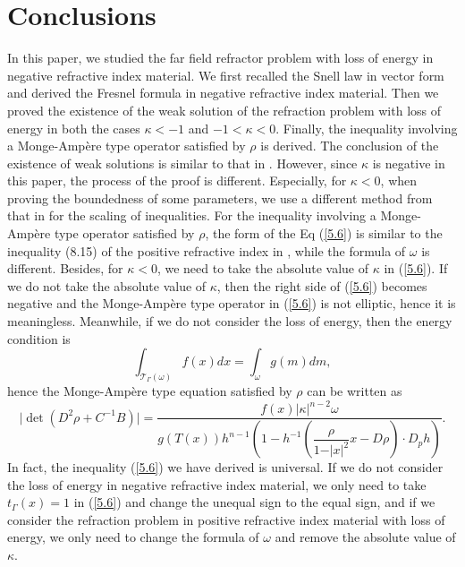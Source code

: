 \documentclass[a4paper,12pt,]{article}
\numberwithin{equation}{section}
\numberwithin{equation}{section} \allowdisplaybreaks
\begin{document}
\section{Conclusions}\label{Section 6}

\sloppy{}

In this paper, we studied the far field refractor problem with loss of energy in negative refractive index material. We first recalled the Snell law in vector form and derived the Fresnel formula in negative refractive index material. Then we proved the existence of the weak solution of the refraction problem with loss of energy in both the cases $\kappa < -1$ and $-1 < \kappa <0$. Finally, the inequality involving a Monge-Amp\`ere type operator satisfied by $\rho$ is derived. The conclusion of the existence of weak solutions is similar to that in \cite{GM13}. However, since $\kappa$ is negative in this paper, the process of the proof is different. Especially, for $\kappa < 0$, when proving the boundedness of some parameters, we use a different method from that in \cite{GM13} for the scaling of inequalities. For the inequality involving a Monge-Amp\`ere type operator satisfied by $\rho$, the form of the Eq (\ref{5.6}) is similar to the inequality (8.15) of the positive refractive index in \cite{GM13}, while the formula of $\omega$ is different. Besides, for $\kappa <0$, we need to take the absolute value of $\kappa$ in (\ref{5.6}). If we do not take the absolute value of $\kappa$, then the right side of (\ref{5.6}) becomes negative and the Monge-Amp\`ere type operator in (\ref{5.6}) is not elliptic, hence it is meaningless. Meanwhile, if we do not consider the loss of energy, then the energy condition is
\begin{equation*}
  \int_{\mathcal{T}_{\Gamma}(\omega)}f(x)dx = \int_{\omega}g(m)dm,
\end{equation*}
hence the Monge-Amp\`ere type equation satisfied by $\rho$ can be written as
\begin{equation*}
  \vert \det (D^{2}\rho + C^{-1}B) \vert = \frac{f(x)\vert \kappa \vert^{n - 2} \omega}{g(T(x))h^{n - 1}\left(1 - h^{-1}\left(\dfrac{\rho}{1 - \vert x \vert^{2}}x - D\rho\right)\cdot D_{p}h\right)}.
\end{equation*}
In fact, the inequality (\ref{5.6}) we have derived is universal. If we do not consider the loss of energy in negative refractive index material, we only need to take $t_{\Gamma}(x) = 1$ in (\ref{5.6}) and change the unequal sign to the equal sign, and if we consider the refraction problem in positive refractive index material with loss of energy, we only need to change the formula of $\omega$ and remove the absolute value of $\kappa$.
\end{document}
